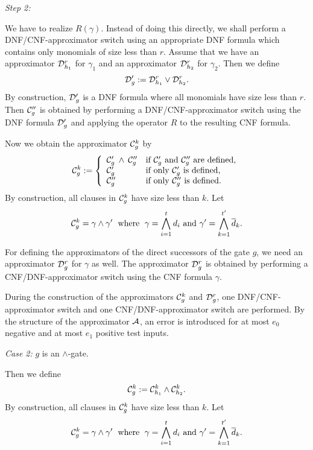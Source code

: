 \documentclass[11pt]{article}
\begin{document}
\smallskip
\noindent
{\em Step 2:}

\smallskip
We have to realize $R(\gamma)$. Instead of doing this directly,
we shall perform a DNF/CNF-approximator switch using an appropriate DNF formula which contains only monomials of
size less than $r$.
Assume that we have an approximator ${\cal D}_{h_1}^r$ for $\gamma_1$ and an approximator ${\cal D}_{h_2}^r$ for
$\gamma_2$. Then we define 
$$
{\cal D}'_g := {\cal D}_{h_1}^r \vee {\cal D}_{h_2}^r.
$$
By construction, ${\cal D}'_g$ is a DNF formula where all monomials have size less than $r$.
Then ${\cal C}''_g$ is obtained by performing a DNF/CNF-approximator switch using the DNF formula ${\cal D}'_g$
and applying the operator $R$ to the resulting CNF formula.

\smallskip
Now we obtain the approximator ${\cal C}_g^k$ by
$$
{\cal C}_g^k := \left\{ \begin{array}{ll}
                    {\cal C}'_g \: \wedge \: {\cal C}''_g & \mbox{if ${\cal C}'_g$ and ${\cal C}''_g$ are defined,} \\
                    {\cal C}'_g & \mbox{if only ${\cal C}'_g$ is defined,} \\
                    {\cal C}''_g & \mbox{if only ${\cal C}''_g$ is defined.}
                            \end{array}
\right.
$$
By construction, all clauses in ${\cal C}_g^k$ have size less than $k$. Let
$$
{\cal C}_g^k = \gamma \wedge \gamma' \; \mbox{ where } \; \gamma = \bigwedge_{i=1}^{t} d_i \mbox{ and } 
\gamma' =  \bigwedge_{k=1}^{t'} \overline{d}_k.
$$

For defining the approximators of the direct successors of the gate $g$, we need an approximator
${\cal D}_g^r$ for $\gamma$ as well. The approximator ${\cal D}_g^r$ is obtained by performing a CNF/DNF-approximator
switch using the CNF formula $\gamma$. 

\smallskip
During the construction of the approximators ${\cal C}_g^k$ and ${\cal D}_g^r$, one DNF/CNF-approximator switch and
one CNF/DNF-approximator switch are performed.
By the structure of the approximator ${\cal A}$, an error is introduced for at most $e_0$ negative and at
most $e_1$ positive test inputs.

\smallskip
\noindent
{\em Case 2:} $g$ is an $\wedge$-gate.

\smallskip
Then we define
$$
{\cal C}_g^k := {\cal C}_{h_1}^k \wedge {\cal C}_{h_2}^k.
$$
By construction, all clauses in ${\cal C}_g^k$ have size less than $k$. Let
$$
{\cal C}_g^k = \gamma \wedge \gamma' \; \mbox{ where } \; \gamma = \bigwedge_{i=1}^{t} d_i \mbox{ and } 
\gamma' =  \bigwedge_{k=1}^{t'} \overline{d}_k.
$$
\end{document}
